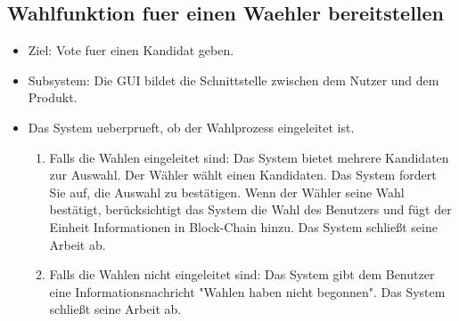 \documentclass[parskip=full,11pt,twoside]{scrartcl}
\begin{document}
\subsection{Wahlfunktion fuer einen Waehler bereitstellen}
\begin{itemize}
	\item Ziel: Vote fuer einen Kandidat geben.
	\item Subsystem: Die GUI bildet die Schnittstelle zwischen dem Nutzer und dem Produkt.
	\item Das System ueberprueft, ob der Wahlprozess eingeleitet ist.	
	\begin{enumerate}
		\item Falls die Wahlen eingeleitet sind: Das System bietet mehrere Kandidaten zur Auswahl. Der Wähler wählt einen Kandidaten. Das System fordert Sie auf, die Auswahl zu bestätigen. Wenn der Wähler seine Wahl bestätigt, berücksichtigt das System die Wahl des Benutzers und fügt der Einheit Informationen in Block-Chain hinzu. Das System schließt seine Arbeit ab.
		\item Falls die Wahlen nicht eingeleitet sind: Das System gibt dem Benutzer eine Informationsnachricht "Wahlen haben nicht begonnen". Das System schließt seine Arbeit ab.
	\end{enumerate}
\end{itemize}
\end{document}
